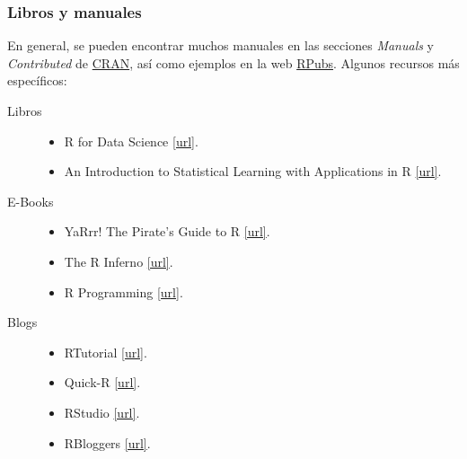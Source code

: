 \documentclass{beamer}
\begin{document}
\begin{frame}
\frametitle{Libros y manuales}

En general, se pueden encontrar muchos manuales en las secciones \textit{Manuals} y \textit{Contributed} de \href{https://cran.r-project.org/}{CRAN}, así como ejemplos en la web \href{https://rpubs.com/}{RPubs}. Algunos recursos más específicos:

\begin{description}
\item[Libros]
\begin{itemize}
 \item R for Data Science \href{http://r4ds.had.co.nz/}{[url]}.
 \item An Introduction to Statistical Learning with Applications in R \href{http://www-bcf.usc.edu/~gareth/ISL/}{[url]}.
\end{itemize}
\item[E-Books]
\begin{itemize}
\item YaRrr! The Pirate's Guide to R \href{http://nathanieldphillips.com/thepiratesguidetor/}{[url]}.
\item The R Inferno \href{http://www.burns-stat.com/pages/Tutor/R_inferno.pdf}{[url]}.
\item R Programming \href{https://en.wikibooks.org/wiki/R_Programming}{[url]}.
\end{itemize}
\item[Blogs]
\begin{itemize}
\item RTutorial \href{http://www.r-tutor.com/}{[url]}.
\item Quick-R \href{http://www.statmethods.net/}{[url]}.
\item RStudio \href{https://blog.rstudio.org/}{[url]}.
\item RBloggers \href{https://www.r-bloggers.com/}{[url]}.
\end{itemize}
\end{description}

\end{frame}
\end{document}
